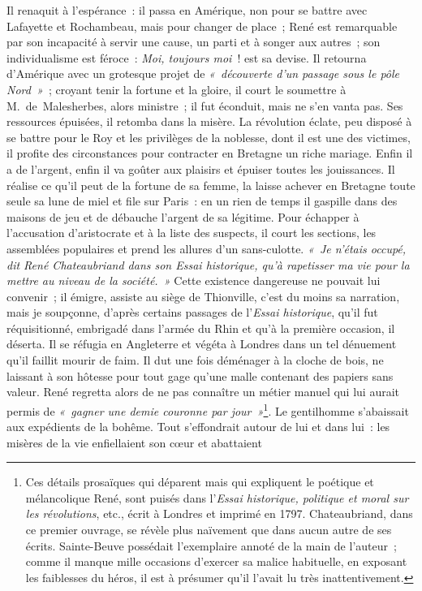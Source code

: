 \documentclass[french,twoside]{book} %
\begin{document}
\label{p582}Il renaquit à l’espérance : il passa en Amérique, non pour se battre avec Lafayette et Rochambeau, mais pour changer de place ; René est remarquable par son incapacité à servir une cause, un parti et à songer aux autres ; son individualisme est féroce : {\itshape Moi, toujours moi} ! est sa devise. Il retourna d’Amérique avec un grotesque projet de \emph{« découverte d’un passage sous le pôle Nord »} ; croyant tenir la fortune et la gloire, il court le soumettre à M. de Malesherbes, alors ministre ; il fut éconduit, mais ne s’en vanta pas. Ses ressources épuisées, il retomba dans la misère. La révolution éclate, peu disposé à se battre pour le Roy et les privilèges de la noblesse, dont il est une des victimes, il profite des circonstances pour contracter en Bretagne un riche mariage. Enfin il a de l’argent, enfin il va goûter aux plaisirs et épuiser toutes les jouissances. Il réalise ce qu’il peut de la fortune de sa femme, la laisse achever en Bretagne toute seule sa lune de miel et file sur Paris : en un rien de temps il gaspille dans des maisons de jeu et de débauche l’argent de sa légitime. Pour échapper à l’accusation d’aristocrate et à la liste des suspects, il court les sections, les assemblées populaires et prend les allures d’un sans-culotte. \emph{« Je n’étais occupé, dit René Chateaubriand dans son \emph{Essai historique}, qu’à rapetisser ma vie pour la mettre au niveau de la société. »} Cette existence dangereuse ne pouvait lui convenir ; il émigre, assiste au siège de Thionville, c’est du moins sa narration, mais je soupçonne, d’après certains passages de l’\emph{Essai historique}, qu’il fut réquisitionné, embrigadé dans l’armée du Rhin et qu’à la première occasion, il déserta. Il se réfugia en Angleterre et végéta à Londres dans un tel dénuement qu’il faillit mourir de faim. Il dut une fois déménager à la cloche de bois, ne laissant à son hôtesse pour tout gage qu’une malle contenant des papiers sans valeur. René regretta alors de ne pas connaître un métier manuel qui lui aurait permis de \emph{« gagner une demie couronne par jour »}\footnote{Ces détails prosaïques qui déparent mais qui expliquent le poétique et mélancolique René, sont puisés dans l’\emph{Essai historique, politique et moral sur les révolutions}, etc., écrit à Londres et imprimé en 1797. Chateaubriand, dans ce premier ouvrage, se révèle plus naïvement que dans aucun autre de ses écrits. Sainte-Beuve possédait l’exemplaire annoté de la main de l’auteur ; comme il manque mille occasions d’exercer sa malice habituelle, en exposant les faiblesses du héros, il est à présumer qu’il l’avait lu très inattentivement.}. Le gentilhomme s’abaissait aux expédients de la bohême. Tout s’effondrait autour de lui et dans lui : les misères de la vie enfiellaient son cœur et abattaient  
\end{document}
